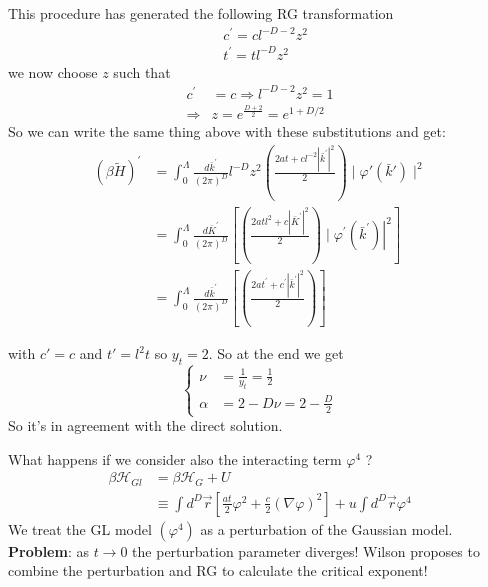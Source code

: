 \documentclass[../../Main/Main.tex]{subfiles}
\begin{document}
This procedure has generated the following RG transformation
$$
\begin{aligned}
& c^{\prime}=c l^{-D-2} z^2 \\
& t^{\prime}=t l^{-D} z^2
\end{aligned}
$$
we now choose $z$ such that
$$
\begin{aligned}
c^{\prime} & =c \Rightarrow l^{-D-2} z^2=1 \\
\Rightarrow & z=e^{\frac{D+2}{2}}=e^{1+D / 2}
\end{aligned}
$$
So we can write the same thing above with these substitutions and get:
$$\begin{align}
(\beta \tilde{H})^{\prime} &= \int_0^{\Lambda} \frac{d \bar{k}^{\prime}}{(2 \pi)^D}l^{-D} z^2\left(\frac{2 a t+c l^{-2}\left|\bar{k}^{\prime}\right|^2}{2}\right)\mid \varphi'(\bar{k}')\mid^{2}  \\
& =\int_0^{\Lambda} \frac{d \bar{K}^{\prime}}{(2 \pi)^D}\left[\left(\frac{2 a t l^2+c\left|\bar{K}^{\prime}\right|^2}{2}\right) \mid \varphi^{\prime}\left.(\bar{k}^{\prime})\right|^2\right] \\
& =\int_0^{\Lambda} \frac{d \bar{k}^{\prime}}{(2 \pi)^{D}}\left[\left(\frac{2 a t^{\prime}+c^{\prime}\left|\bar{k}^{\prime}\right|^2}{2}\right)\right]
\end{align}
$$


with $c' = c$ and $t' = l^{2}t$ so $y_{t} =2$.
So at the end we get 
$$\left\{
\begin{align}
\nu &= \frac{1}{y_{t}} = \frac{1}{2} \\
\alpha& = 2 - D\nu = 2 - \frac{D}{2}
\end{align}
\right.$$
So it's in agreement with the direct solution.

What happens if we consider also the interacting term $\varphi^4$ ?
$$\begin{aligned}
\beta \mathcal{H}_{G l} &= \beta \mathcal{H}_G+U \\
& \equiv \int d^D \vec{r}\left[\frac{a t}{2} \varphi^2+\frac{c}{2}(\nabla \varphi)^2\right]+u \int d^D \vec{r} \varphi^4
\end{aligned}$$
We treat  the GL model $\left(\varphi^4\right)$ as a perturbation of the Gaussian model.
\newline
\textbf{Problem}: as $t \to 0$ the perturbation parameter diverges!
Wilson proposes to combine the perturbation and RG to calculate the critical exponent!
\end{document}
